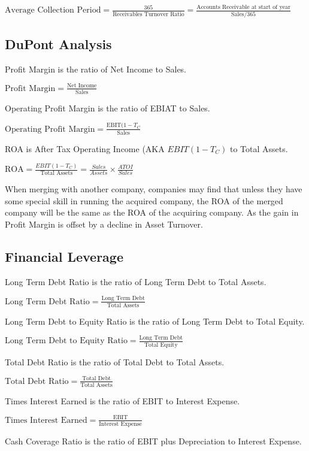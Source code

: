 $\text{Average Collection Period} = \frac{365}{\text{Receivables Turnover Ratio}} = \frac{\text{Accounts Receivable at start of year}}{\text{Sales}/ 365}$

\subsection{DuPont Analysis}

Profit Margin is the ratio of Net Income to Sales.

$\text{Profit Margin} = \frac{\text{Net Income}}{\text{Sales}}$

Operating Profit Margin is the ratio of EBIAT to Sales.

$\text{Operating Profit Margin} = \frac{\text{EBIT}(1-T_C}{\text{Sales}}$

ROA is After Tax Operating Income (AKA $EBIT(1-T_C)$ to Total Assets.

$\text{ROA} = \frac{EBIT(1-T_C)}{\text{Total Assets}} = \frac{Sales}{Assets}\times \frac{ATOI}{Sales}$

When merging with another company, companies may find that unless they have some special skill
in running the acquired company, the ROA of the merged company will be the same as the ROA of the acquiring company. As the gain in Profit Margin is offset by a decline in Asset Turnover.


\subsection{Financial Leverage}

Long Term Debt Ratio is the ratio of Long Term Debt to Total Assets.

$\text{Long Term Debt Ratio} = \frac{\text{Long Term Debt}}{\text{Total Assets}}$

Long Term Debt to Equity Ratio is the ratio of Long Term Debt to Total Equity.

$\text{Long Term Debt to Equity Ratio} = \frac{\text{Long Term Debt}}{\text{Total Equity}}$

Total Debt Ratio is the ratio of Total Debt to Total Assets.

$\text{Total Debt Ratio} = \frac{\text{Total Debt}}{\text{Total Assets}}$

Times Interest Earned is the ratio of EBIT to Interest Expense.

$\text{Times Interest Earned} = \frac{\text{EBIT}}{\text{Interest Expense}}$

Cash Coverage Ratio is the ratio of EBIT plus Depreciation to Interest Expense.

